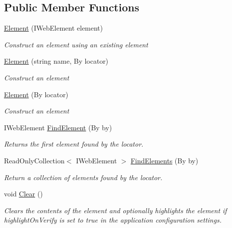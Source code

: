 \subsection*{Public Member Functions}
\begin{DoxyCompactItemize}
\item 
\hyperlink{class_proto_test_1_1_golem_1_1_web_driver_1_1_element_a1a5e5985c0f331c987da8d1e340d6405}{Element} (I\-Web\-Element element)
\begin{DoxyCompactList}\small\item\em Construct an element using an existing element \end{DoxyCompactList}\item 
\hyperlink{class_proto_test_1_1_golem_1_1_web_driver_1_1_element_aa21488bc7d4809f61366115af259aebf}{Element} (string name, By locator)
\begin{DoxyCompactList}\small\item\em Construct an element \end{DoxyCompactList}\item 
\hyperlink{class_proto_test_1_1_golem_1_1_web_driver_1_1_element_abfd2a4dfd8501bf4241e3e2dad8b1918}{Element} (By locator)
\begin{DoxyCompactList}\small\item\em Construct an element \end{DoxyCompactList}\item 
I\-Web\-Element \hyperlink{class_proto_test_1_1_golem_1_1_web_driver_1_1_element_a1c9f71a8149055f3b049d11039cd4ace}{Find\-Element} (By by)
\begin{DoxyCompactList}\small\item\em Returns the first element found by the locator. \end{DoxyCompactList}\item 
Read\-Only\-Collection$<$ I\-Web\-Element $>$ \hyperlink{class_proto_test_1_1_golem_1_1_web_driver_1_1_element_a3f09a65a106e6af452eda932066a2352}{Find\-Elements} (By by)
\begin{DoxyCompactList}\small\item\em Return a collection of elements found by the locator. \end{DoxyCompactList}\item 
void \hyperlink{class_proto_test_1_1_golem_1_1_web_driver_1_1_element_a248aa8a1b73eea51e3daf5ff6c8c0219}{Clear} ()
\begin{DoxyCompactList}\small\item\em Clears the contents of the element and optionally highlights the element if highlight\-On\-Verify is set to true in the application configuration settings. \end{DoxyCompactList}\item 

\end{DoxyCompactItemize}
